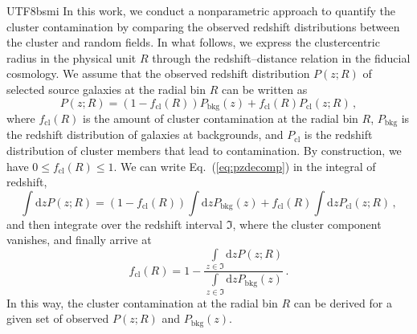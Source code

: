 \documentclass[longauth]{aa}
\newcommand{\redshift}{\ensuremath{z}}
\newcommand{\dif}{\ensuremath{\mathrm{d}}}
\newcommand{\fcl}{\ensuremath{f_{\mathrm{cl}}}}
\begin{document}
\begin{CJK*}{UTF8}{bsmi}
In this work, we conduct a nonparametric approach to quantify the cluster contamination by comparing the observed redshift distributions between the cluster and random fields.
In what follows, we express the clustercentric radius in the physical unit $R$ through the redshift--distance relation in the fiducial cosmology.
We assume that the observed redshift distribution $P\left(\redshift; R\right)$ of selected source galaxies at the radial bin $R$ can be written as
%
\begin{equation}
\label{eq:pzdecomp}
P\left(\redshift; R\right) = 
\left(1 - \fcl\left(R\right)\right)
P_{\mathrm{bkg}}\left(\redshift\right) + 
\fcl\left(R\right)
P_{\mathrm{cl}}\left(\redshift; R\right) \, ,
\end{equation}
%
where $\fcl\left(R\right)$ is the amount of cluster contamination at the radial bin $R$, $P_{\mathrm{bkg}}$ is the redshift distribution of galaxies at backgrounds, and $P_{\mathrm{cl}}$ is the redshift distribution of cluster members that lead to contamination.
By construction, we have $0\leq\fcl\left(R\right)\leq1$.
We can write Eq.~(\ref{eq:pzdecomp}) in the integral of redshift, 
\[
\int\dif\redshift P\left(\redshift; R\right) = 
\left(1 - \fcl\left(R\right)\right)
\int\dif\redshift P_{\mathrm{bkg}}\left(\redshift\right) + 
\fcl\left(R\right)
\int\dif\redshift P_{\mathrm{cl}}\left(\redshift; R\right) \, ,
\]
and then integrate over the redshift interval $\mathfrak{I}$, 
where the cluster component vanishes, and finally arrive at 
%
\begin{equation}
\label{eq:fcl}
\fcl\left(R\right) =  1 - 
\frac{
\int\limits_{\redshift\in\mathfrak{I}}\dif\redshift P\left(\redshift; R\right)
}{
\int\limits_{\redshift\in\mathfrak{I}}\dif\redshift P_{\mathrm{bkg}}\left(\redshift\right)
}
\, .
\end{equation}
%
In this way, the cluster contamination at the radial bin $R$ can be derived for a given set of observed $P\left(\redshift; R\right)$ and $P_{\mathrm{bkg}}\left(\redshift\right)$.


\end{CJK*}
\end{document}
